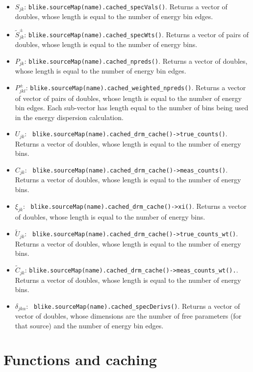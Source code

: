 \documentclass[preprint]{aastex}
\begin{document}
\begin{itemize}
\item{ {\bf $S_{jk}$}: {\tt blike.sourceMap(name).cached\_specVals()}.
    Returns a vector of doubles, whose length is equal to the
    number of energy bin edges.}
\item{ {\bf $\tilde{S}_{jk}^{\pm}$}: {\tt blike.sourceMap(name).cached\_specWts()}.
    Returns a vector of pairs of doubles, whose length is equal to the
    number of energy bins.}
\item{ {\bf $P_{jk}$}: {\tt blike.sourceMap(name).cached\_npreds()}.
    Returns a vector of doubles, whose length is equal to the
    number of energy bin edges.}
\item{ {\bf $P_{jkl}^{\pm}$}: {\tt blike.sourceMap(name).cached\_weighted\_npreds()}.
    Returns a vector of vector of pairs of doubles, whose length is equal to the
    number of energy bin edges.  Each sub-vector has length equal to the number
    of bins being used in the energy dispersion calculation.}
\item{ {\bf $U_{jk}$}: {\tt
      blike.sourceMap(name).cached\_drm\_cache()->true\_counts()}.
    Returns a vector of doubles, whose length is equal to the
    number of energy bins.}
\item{ {\bf $C_{jk}$}: {\tt
      blike.sourceMap(name).cached\_drm\_cache()->meas\_counts()}.
    Returns a vector of doubles, whose length is equal to the
    number of energy bins.}
\item{ {\bf $\xi_{jk}$}: {\tt
      blike.sourceMap(name).cached\_drm\_cache()->xi()}.  Returns
    a vector of doubles, whose length is equal to the number of energy
    bins.}
\item{ {\bf $\tilde{U}_{jk}$}: {\tt
      blike.sourceMap(name).cached\_drm\_cache()->true\_counts\_wt()}.
    Returns a vector of doubles, whose length is equal to the number
    of energy bins.}
\item{ {\bf $\tilde{C}_{jk}$}:
    {\tt blike.sourceMap(name).cached\_drm\_cache()->meas\_counts\_wt().}.
    Returns a vector of doubles, whose length is equal to the
    number of energy bins.}
\item{ {\bf $\delta_{jk\alpha}$}: {\tt
      blike.sourceMap(name).cached\_specDerivs()}.  Returns a
    vector of vector of doubles, whose dimensions are the number of
    free parameters (for that source) and the number of energy bin edges.}
\end{itemize}



\section{Functions and caching}\label{app:functions}
\end{document}
